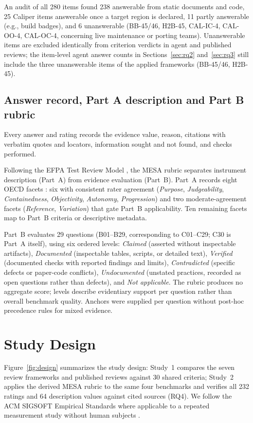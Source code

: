 \documentclass[10pt,conference]{IEEEtran}
\begin{document}
An audit of all 280 items found 238 answerable from static documents and code, 25 Caliper items answerable once a target region is declared, 11 partly answerable (e.g., build badges), and 6 unanswerable (BB-45/46, H2B-45, CAL-IC-4, CAL-OO-4, CAL-OC-4, concerning live maintenance or porting teams). Unanswerable items are excluded identically from criterion verdicts in agent and published reviews; the item-level agent answer counts in Sections~\ref{sec:rq2} and~\ref{sec:rq3} still include the three unanswerable items of the applied frameworks (BB-45/46, H2B-45).

\subsection{Answer record, Part A description and Part B rubric}
\label{sec:evidence-record}
\label{sec:rubric}
Every answer and rating records the evidence value, reason, citations with verbatim quotes and locators, information sought and not found, and checks performed.

Following the EFPA Test Review Model \cite{efpa_test_review_model_2025}, the MESA rubric separates instrument description (Part~A) from evidence evaluation (Part~B). Part~A records eight OECD facets \cite{cohn_hernandez_orallo_oecd_2023}: six with consistent rater agreement (\emph{Purpose}, \emph{Judgeability}, \emph{Containedness}, \emph{Objectivity}, \emph{Autonomy}, \emph{Progression}) and two moderate-agreement facets (\emph{Reference}, \emph{Variation}) that gate Part~B applicability. Ten remaining facets map to Part~B criteria or descriptive metadata.

Part~B evaluates 29 questions (B01--B29, corresponding to C01--C29; C30 is Part~A itself), using six ordered levels: \emph{Claimed} (asserted without inspectable artifacts), \emph{Documented} (inspectable tables, scripts, or detailed text), \emph{Verified} (documented checks with reported findings and limits), \emph{Contradicted} (specific defects or paper-code conflicts), \emph{Undocumented} (unstated practices, recorded as open questions rather than defects), and \emph{Not applicable}. The rubric produces no aggregate score; levels describe evidentiary support per question rather than overall benchmark quality. Anchors were supplied per question without post-hoc precedence rules for mixed evidence.

\section{Study Design}
Figure~\ref{fig:design} summarizes the study design: Study~1 compares the seven review frameworks and published reviews against 30 shared criteria; Study~2 applies the derived MESA rubric to the same four benchmarks and verifies all 232 ratings and 64 description values against cited sources (RQ4). We follow the ACM SIGSOFT Empirical Standards where applicable to a repeated measurement study without human subjects \cite{sigsoft_empirical_standards}.
\end{document}
